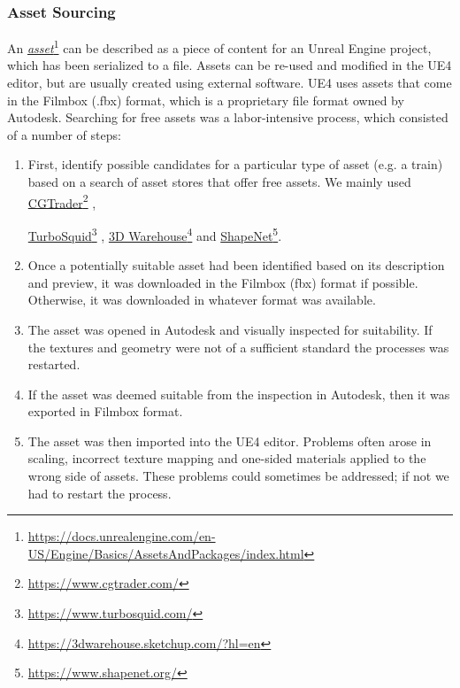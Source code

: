 \subsubsection{Asset Sourcing}
%
An \href{https://docs.unrealengine.com/en-US/Engine/Basics/AssetsAndPackages/index.html}{\textit{asset}}\footnote{\href{https://docs.unrealengine.com/en-US/Engine/Basics/AssetsAndPackages/index.html}{https://docs.unrealengine.com/en-US/Engine/Basics/AssetsAndPackages/index.html}} can be described as a piece of content for an Unreal Engine project, which has been serialized to a file. Assets can be re-used and modified in the UE4 editor, but are usually created using external software. UE4 uses assets that come in the Filmbox (.fbx) format, which is a proprietary file format owned by Autodesk.
Searching for free assets was a labor-intensive process, which consisted of a number of steps:
\begin{enumerate}
    \item First, identify possible candidates for a particular type of asset (e.g. a train) based on a search of asset stores that offer free assets. We mainly used \href{https://www.cgtrader.com/}{CGTrader}\footnote{\href {https://www.cgtrader.com/}{https://www.cgtrader.com/}} ,
    
    \href{https://www.turbosquid.com/}{TurboSquid}\footnote{\href {https://www.turbosquid.com/}{https://www.turbosquid.com/}}
    , 
    \href{https://3dwarehouse.sketchup.com/?hl=en}{3D Warehouse}\footnote{\href {https://3dwarehouse.sketchup.com/?hl=en}{https://3dwarehouse.sketchup.com/?hl=en}} 
    and
    \href{https://www.shapenet.org/}{ShapeNet}\footnote{\href {https://www.shapenet.org/}{https://www.shapenet.org/}}.
    
    \item Once a potentially suitable asset had been identified based on its description and preview, it was downloaded in the Filmbox (fbx) format if possible. Otherwise, it was downloaded in whatever format was available. 
    \item The asset was opened in Autodesk  and visually inspected for suitability. If the textures and geometry were not of a sufficient standard the processes was restarted.
    \item If the asset was deemed suitable from the inspection in Autodesk, then it was exported in Filmbox format.
    \item The asset was then imported into the UE4 editor. Problems often arose in scaling, incorrect texture mapping and one-sided materials applied to the wrong side of assets. These problems could sometimes be addressed; if not we had to restart the process.
\end{enumerate}

